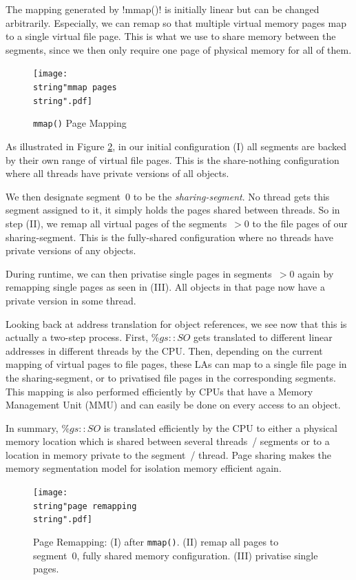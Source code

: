 \documentclass{sigplanconf}
\makeatletter
\renewcommand\lstinline[1][]{%
  \Collectverb{\@@myverb}%
}
\def\@@myverb#1{%
    \begingroup
    \fboxsep=0.2em
    \colorbox{verylightgray}{\oldlstinline|#1|}%
    \endgroup
}
\makeatother
\begin{document}
The mapping generated by \lstinline!mmap()! is initially linear but
can be changed arbitrarily. Especially, we can remap so that multiple
virtual memory pages map to a single virtual file page. This is what
we use to share memory between the segments, since we then only
require one page of physical memory for all of them.

\begin{figure}[h]
  \centering
  \texttt{[image: \\string"mmap pages\\string".pdf]}
  \caption{\texttt{mmap()} Page Mapping\label{fig:mmap()-Page-Mapping}}
\end{figure}


As illustrated in Figure \ref{fig:Page-Remapping}, in our initial
configuration (I) all segments are backed by their own range of
virtual file pages. This is the share-nothing configuration where
all threads have private versions of all objects.

We then designate segment~0 to be the \emph{sharing-segment}. No
thread gets this segment assigned to it, it simply holds the pages
shared between threads. So in step (II), we remap all virtual pages of
the segments~$>0$ to the file pages of our sharing-segment. This is
the fully-shared configuration where no threads have private versions
of any objects.

During runtime, we can then privatise single pages in segments~$>0$
again by remapping single pages as seen in (III). All objects in that
page now have a private version in some thread.

Looking back at address translation for object references, we see now
that this is actually a two-step process. First, $\%gs{::}SO$ gets
translated to different linear addresses in different threads by the
CPU. Then, depending on the current mapping of virtual pages to file
pages, these LAs can map to a single file page in the sharing-segment,
or to privatised file pages in the corresponding segments. This
mapping is also performed efficiently by CPUs that have a Memory
Management Unit (MMU) and can easily be done on every access to an
object.

In summary, $\%gs{::}SO$ is translated efficiently by the CPU to
either a physical memory location which is shared between several
threads~/ segments or to a location in memory private to the segment~/
thread. Page sharing makes the memory segmentation model for isolation
memory efficient again.

\begin{figure}[h]
  \centering
  \texttt{[image: \\string"page remapping\\string".pdf]}
  \caption{Page Remapping: (I) after \texttt{mmap()}. (II) remap all pages to
    segment~0, fully shared memory configuration. (III) privatise single
    pages.\label{fig:Page-Remapping}}
\end{figure}
\end{document}
